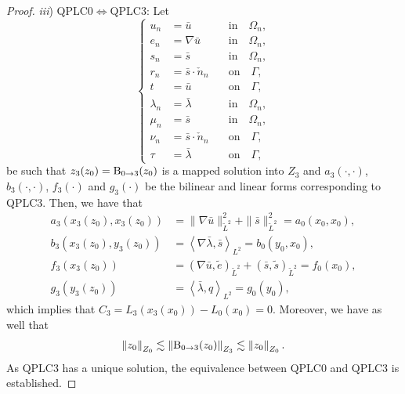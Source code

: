 \begin{proof}
\noindent \textit{iii}) QPLC0$\iff$QPLC3: Let
\begin{equation}
\left\lbrace
\begin{array}{rll}
    u_n       &= \bar{u}                   & \quad \textrm{in} \quad \Omega_n,\\
    e_n       &= \nabla \bar{u}            & \quad \textrm{in} \quad \Omega_n,\\
    s_n       &= \bar{s}                   & \quad \textrm{in} \quad \Omega_n,\\
    r_n       &= \bar{s} \cdot \check{n}_n & \quad \textrm{on} \quad \Gamma,\\
    t         &= \bar{u}                   & \quad \textrm{on} \quad \Gamma,\\
    \lambda_n &= \bar{\lambda}             & \quad \textrm{in} \quad \Omega_n,\\
    \mu_n     &= \bar{s}                   & \quad \textrm{in} \quad \Omega_n,\\
    \nu_n     &= \bar{s} \cdot \check{n}_n & \quad \textrm{on} \quad \Gamma,\\
    \tau      &= \bar{\lambda}             & \quad \textrm{on} \quad \Gamma,
\end{array}
\right.
\end{equation}
be such that $z_3(z_0) = \operatorname{B}_{0 \to 3} (z_0)$ is a mapped solution into $Z_3$
and $a_3(\cdot,\cdot)$, $b_3(\cdot, \cdot)$, $f_3(\cdot)$ and $g_3(\cdot)$ be the bilinear and linear forms corresponding to QPLC3.
Then, we have that
\begin{align}
a_3(x_3(z_0), x_3(z_0)) &= \|\nabla \bar{u}\|^2_{\tilde{L}^2}+\|\bar{s}\|^2_{\tilde{L}^2} = a_0(x_0, x_0),\\
b_3(x_3(z_0), y_3(z_0)) &= \left\langle \nabla \bar{\lambda}, \bar{s} \right\rangle_{L^2} = b_0(y_0, x_0),\\
f_3(x_3(z_0))   &= \left( \nabla \bar{u}, \tilde{e}\right)_{\tilde{L}^2} + \left( \bar{s}, \tilde{s}\right)_{\tilde{L}^2} = f_0(x_0), \\
g_3(y_3(z_0))   &= \left\langle \bar{\lambda} , q \right\rangle_{L^2}  = g_0(y_0),
\end{align}
which implies that $C_3 = L_3(x_3(x_0))-L_0(x_0) = 0$.
Moreover, we have as well that
\begin{equation}
\left\|z_0\right\|_{Z_0}
\lesssim
\left\|\operatorname{B}_{0 \to 3}(z_0)\right\|_{Z_3}
\lesssim
\left\|z_0\right\|_{Z_0}.
\end{equation}
As QPLC3 has a unique solution, the equivalence between QPLC0 and QPLC3 is established. 
\end{proof}
